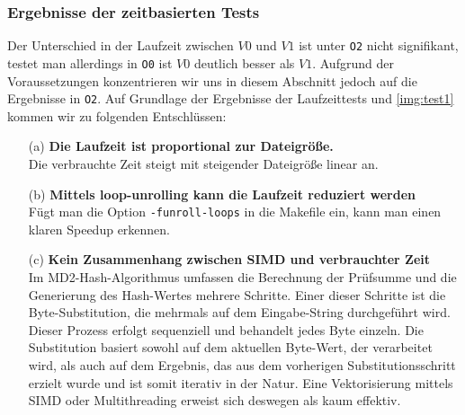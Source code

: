 \subsubsection{Ergebnisse der zeitbasierten Tests}
Der Unterschied in der Laufzeit zwischen $V0$ und $V1$ ist unter \texttt{O2} nicht signifikant,
testet man allerdings in \texttt{O0} ist $V0$ deutlich besser als $V1$.
Aufgrund der Voraussetzungen konzentrieren
wir uns in diesem Abschnitt jedoch auf die Ergebnisse in \texttt{O2}.
Auf Grundlage der Ergebnisse der Laufzeittests und \ref*{img:test1} kommen wir zu folgenden Entschlüssen:
\begin{itemize}
    \item [(a)] \textbf{Die Laufzeit ist proportional zur Dateigröße.}
          \\
          Die verbrauchte Zeit steigt mit steigender Dateigröße linear an.
    \item [(b)] \textbf{Mittels loop-unrolling kann die Laufzeit reduziert werden}\cite{gnuOptimierung}
          \\
          Fügt man die Option \texttt{-funroll-loops} in die Makefile ein, kann man 
          einen klaren Speedup erkennen.

    \item [(c)] \textbf{Kein Zusammenhang zwischen SIMD und verbrauchter Zeit}
          \\
          Im MD2-Hash-Algorithmus umfassen die Berechnung der Prüfsumme und die 
          Generierung des Hash-Wertes mehrere Schritte. Einer dieser Schritte 
          ist die Byte-Substitution, die mehrmals auf dem Eingabe-String durchgeführt wird.
          Dieser Prozess erfolgt sequenziell und behandelt jedes Byte einzeln. 
          Die Substitution basiert sowohl auf dem aktuellen Byte-Wert, der 
          verarbeitet wird, als auch auf dem Ergebnis, das aus dem vorherigen 
          Substitutionsschritt erzielt wurde und ist somit iterativ in der Natur.
          Eine Vektorisierung mittels SIMD oder Multithreading erweist sich deswegen als kaum effektiv.
\end{itemize}

